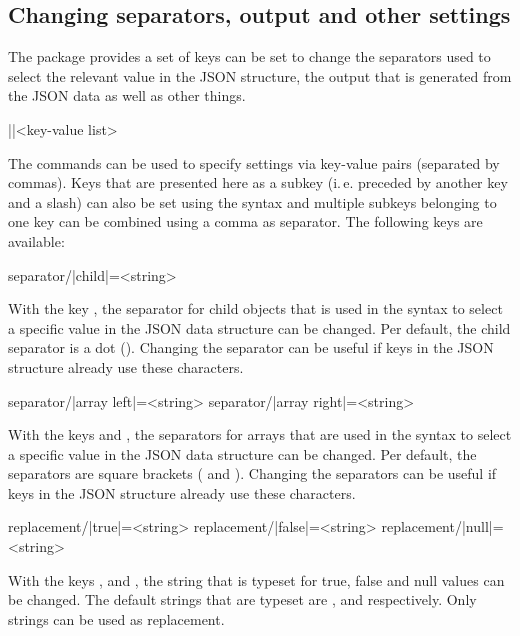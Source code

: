 \documentclass[a4paper]{article}
\begin{document}
{{\subsection{Changing separators, output and other settings}\label{sec:settings}

The package provides a set of keys can be set to change the separators used to select the relevant value in the JSON structure, the output that is generated from the JSON data as well as other things.

\begin{macrodef}
|\JSONParseSet|{<key-value list>}
\end{macrodef}
The commands \macro{\JSONParseSet} can be used to specify settings via key-value pairs (separated by commas). Keys that are presented here as a subkey (i.\,e. preceded by another key and a slash) can also be set using the syntax  and multiple subkeys belonging to one key can be combined using a comma as separator. The following keys are available:

\begin{macrodef}
separator/|child|={<string>}
\end{macrodef}
With the key , the separator for child objects that is used in the syntax to select a specific value in the JSON data structure can be changed. Per default, the child separator is a dot (). Changing the separator can be useful if keys in the JSON structure already use these characters. 

\begin{macrodef}
separator/|array left|={<string>}
separator/|array right|={<string>}
\end{macrodef}
With the keys  and , the separators for arrays that are used in the syntax to select a specific value in the JSON data structure can be changed. Per default, the separators are square brackets (\macro{[} and \macro{]}). Changing the separators can be useful if keys in the JSON structure already use these characters. 

\begin{macrodef}
replacement/|true|={<string>}
replacement/|false|={<string>}
replacement/|null|={<string>}
\end{macrodef}
With the keys ,  and , the string that is typeset for true, false and null values can be changed. The default strings that are typeset are ,  and  respectively. Only strings can be used as replacement.

}}
\end{document}
